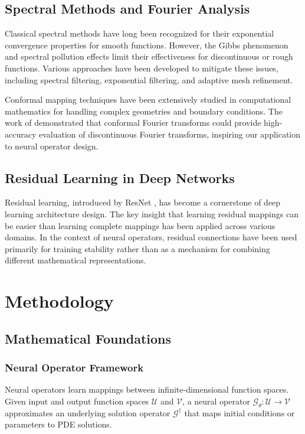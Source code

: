 \documentclass[11pt]{article}
\begin{document}
\subsection{Spectral Methods and Fourier Analysis}

Classical spectral methods have long been recognized for their exponential convergence properties for smooth functions. However, the Gibbs phenomenon and spectral pollution effects limit their effectiveness for discontinuous or rough functions. Various approaches have been developed to mitigate these issues, including spectral filtering, exponential filtering, and adaptive mesh refinement.

Conformal mapping techniques have been extensively studied in computational mathematics for handling complex geometries and boundary conditions. The work of \citet{barnett2010conformal} demonstrated that conformal Fourier transforms could provide high-accuracy evaluation of discontinuous Fourier transforms, inspiring our application to neural operator design.

\subsection{Residual Learning in Deep Networks}

Residual learning, introduced by ResNet \citep{he2016deep}, has become a cornerstone of deep learning architecture design. The key insight that learning residual mappings can be easier than learning complete mappings has been applied across various domains. In the context of neural operators, residual connections have been used primarily for training stability rather than as a mechanism for combining different mathematical representations.

\section{Methodology}

\subsection{Mathematical Foundations}

\subsubsection{Neural Operator Framework}

Neural operators learn mappings between infinite-dimensional function spaces. Given input and output function spaces $\mathcal{U}$ and $\mathcal{V}$, a neural operator $\mathcal{G}_\theta: \mathcal{U} \rightarrow \mathcal{V}$ approximates an underlying solution operator $\mathcal{G}^\dagger$ that maps initial conditions or parameters to PDE solutions.
\end{document}
